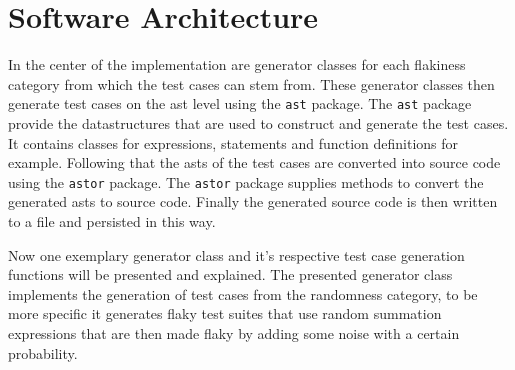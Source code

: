\documentclass[
fancyheadings, %
%
%
]{stsreprt}
\begin{document}
\section{Software Architecture}
In the center of the implementation are generator classes for each flakiness category from which the test cases can stem from. 
These generator classes then generate test cases on the \acrshort{ast} level using the \texttt{ast} package.
The \texttt{ast} package provide the datastructures that are used to construct and generate the test cases. 
It contains classes for expressions, statements and function definitions for example. 
Following that the \acrshort{ast}s of the test cases are converted into source code using the \texttt{astor} package. 
The \texttt{astor} package supplies methods to convert the generated \acrshort{ast}s to source code. 
Finally the generated source code is then written to a file and persisted in this way.\par
Now one exemplary generator class and it's respective test case generation functions will be presented and explained.
The presented generator class implements the generation of test cases from the randomness category, to be more specific it generates flaky test suites that use random summation expressions that are then made flaky by adding some noise with a certain probability.
\end{document}
